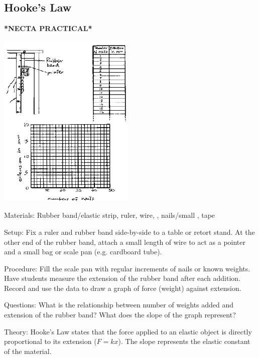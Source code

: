 \begin{multicols}{2}
\subsection{Hooke's Law}
\textbf{*NECTA PRACTICAL*}
\begin{center}
\includegraphics[width=0.49\textwidth]{./img/source/meas-mass.png}
\end{center}

\begin{description*}
\item[Materials:]{Rubber band/elastic strip, ruler, wire, , nails/small , tape}
\item[Setup:]{Fix a ruler and rubber band side-by-side to a table or retort stand. At the other end of the rubber band, attach a small length of wire to act as a pointer and a small bag or scale pan (e.g. cardboard tube).}
\item[Procedure:]{Fill the scale pan with regular increments of nails or known weights. Have students measure the extension of the rubber band after each addition. Record and use the data to draw a graph of force (weight) against extension.}
\item[Questions:]{What is the relationship between number of weights added and extension of the rubber band? What does the slope of the graph represent?}
\item[Theory:]{Hooke's Law states that the force applied to an elastic object is directly proportional to its extension ($F = kx$). The slope represents the elastic constant of the material. }
\end{description*}


\end{multicols}
